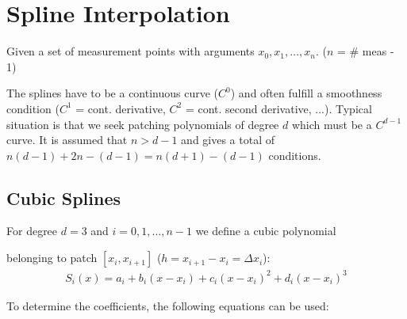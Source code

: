 \section{Spline Interpolation}

Given a set of measurement points with arguments $x_0,x_1,\ldots,x_n$.
($n$ = \# meas - 1)


The splines have to be a continuous curve ($C^0$) and often fulfill a smoothness condition
($C^1$ = cont. derivative, $C^2$ = cont. second derivative, ...).
Typical situation is that we seek patching polynomials of degree $d$ which must be a $C^{d-1}$ curve.
It is assumed that $n > d-1$ and gives a total of $n(d-1) + 2n - (d-1) = n(d+1) - (d-1)$ conditions.

\subsection{Cubic Splines}

For degree $d = 3$ and $i=0,1,\ldots,n-1$ we define a cubic polynomial
\begin{snugshade*}
    belonging to patch $[x_i,x_{i+1}]$ ($h=x_{i+1}-x_i = \Delta x_i$):
    \begin{align*}
        S_i(x) = a_i + b_i(x-x_i) + c_i(x-x_i)^2 + d_i(x-x_i)^3
    \end{align*}
\end{snugshade*}

To determine the coefficients, the following equations can be used:

